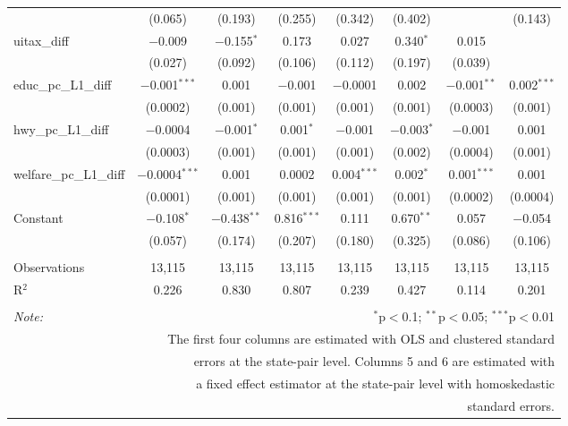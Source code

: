 \begin{table}[!htbp]
\begin{tabular}{@{\extracolsep{5pt}}lccccccc}
  & (0.065) & (0.193) & (0.255) & (0.342) & (0.402) &  & (0.143) \\ 
  uitax\_diff & $-$0.009 & $-$0.155$^{*}$ & 0.173 & 0.027 & 0.340$^{*}$ & 0.015 &  \\ 
  & (0.027) & (0.092) & (0.106) & (0.112) & (0.197) & (0.039) &  \\ 
  educ\_pc\_L1\_diff & $-$0.001$^{***}$ & 0.001 & $-$0.001 & $-$0.0001 & 0.002 & $-$0.001$^{**}$ & 0.002$^{***}$ \\ 
  & (0.0002) & (0.001) & (0.001) & (0.001) & (0.001) & (0.0003) & (0.001) \\ 
  hwy\_pc\_L1\_diff & $-$0.0004 & $-$0.001$^{*}$ & 0.001$^{*}$ & $-$0.001 & $-$0.003$^{*}$ & $-$0.001 & 0.001 \\ 
  & (0.0003) & (0.001) & (0.001) & (0.001) & (0.002) & (0.0004) & (0.001) \\ 
  welfare\_pc\_L1\_diff & $-$0.0004$^{***}$ & 0.001 & 0.0002 & 0.004$^{***}$ & 0.002$^{*}$ & 0.001$^{***}$ & 0.001 \\ 
  & (0.0001) & (0.001) & (0.001) & (0.001) & (0.001) & (0.0002) & (0.0004) \\ 
  Constant & $-$0.108$^{*}$ & $-$0.438$^{**}$ & 0.816$^{***}$ & 0.111 & 0.670$^{**}$ & 0.057 & $-$0.054 \\ 
  & (0.057) & (0.174) & (0.207) & (0.180) & (0.325) & (0.086) & (0.106) \\ 
 \hline \\[-1.8ex] 
Observations & 13,115 & 13,115 & 13,115 & 13,115 & 13,115 & 13,115 & 13,115 \\ 
R$^{2}$ & 0.226 & 0.830 & 0.807 & 0.239 & 0.427 & 0.114 & 0.201 \\ 
\hline 
\hline \\[-1.8ex] 
\textit{Note:}  & \multicolumn{7}{r}{$^{*}$p$<$0.1; $^{**}$p$<$0.05; $^{***}$p$<$0.01} \\ 
 & \multicolumn{7}{r}{The first four columns are estimated with OLS and clustered standard} \\ 
 & \multicolumn{7}{r}{ errors at the state-pair level. Columns 5 and 6 are estimated with} \\ 
 & \multicolumn{7}{r}{a fixed effect estimator at the state-pair level with homoskedastic} \\ 
 & \multicolumn{7}{r}{standard errors.} \\ 
\end{tabular} 
\end{table} 
